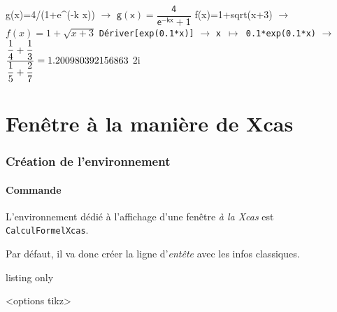 \documentclass[french,a4paper,11pt]{article}
\begin{document}
\begin{PresentationCode}{}
\begin{CalculFormelGeogebra}[CouleurEntete=pink!25,CouleurNumero=yellow!25,Largeur=15]
	\LigneCalculsGeogebra%
		{\sffamily g(x)=4/(1+e\textasciicircum(-k x))}
		{$\rightarrow$ \: $\mathsf{g(x)=\dfrac{4}{e^{-kx}+1}}$}
	\LigneCalculsGeogebra
		{f(x)=1+sqrt(x+3)}
		{$\rightarrow$ \: $f(x)=1+\sqrt{x+3}$}
	\LigneCalculsGeogebra
		{\texttt{Dériver[exp(0.1*x)]}}
		{$\rightarrow$ \: \texttt{x $\mapsto$ 0.1*exp(0.1*x)}}
		{$\rightarrow$ \: $\dfrac{\dfrac14+\dfrac13}{\dfrac15+\dfrac27}=
			\fpeval{(1/4+1/3)/(1/5+2/7)}$}
		{$2\text{i}$}
\end{CalculFormelGeogebra}
\end{PresentationCode}

\pagebreak

\part{Fenêtre à la manière de Xcas}

\section{Création de l'environnement}

\subsection{Commande}

\begin{cautionblock}
L'environnement dédié à l'affichage d'une fenêtre \textit{à la Xcas} est \texttt{CalculFormelXcas}.

Par défaut, il va donc créer la ligne d'\textit{entête} avec les infos classiques.
\end{cautionblock}

\begin{PresentationCode}{listing only}
\begin{CalculFormelXcas}<options tikz>
\end{CalculFormelXcas}
\end{PresentationCode}

\begin{PresentationCode}{}
\begin{CalculFormelXcas}
\end{CalculFormelXcas}
\end{PresentationCode}
\end{document}
